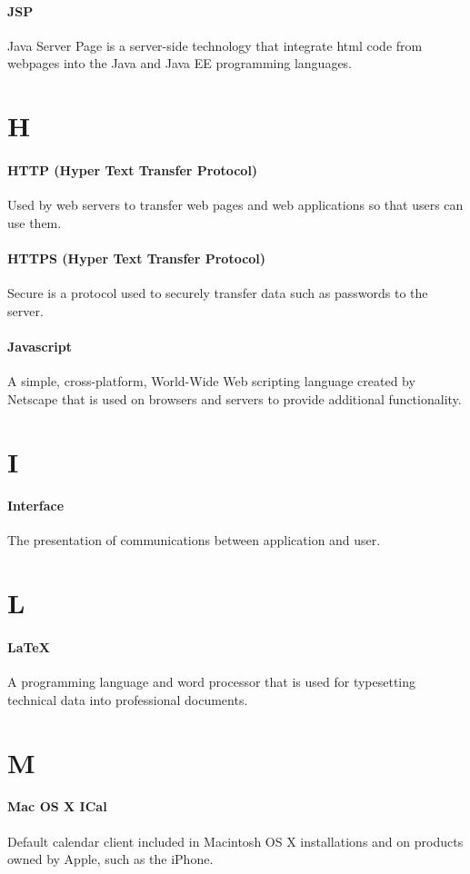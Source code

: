 \documentclass[letterpaper,12pt]{report}
\begin{document}
\paragraph{JSP} Java Server Page is a server-side technology that integrate html code from webpages into the Java and Java EE programming languages.
\section*{H}
\paragraph{HTTP (Hyper Text Transfer Protocol)} Used by web servers to transfer web pages and web applications so that users can use them.
\paragraph{HTTPS (Hyper Text Transfer Protocol)} Secure is a protocol used to securely transfer data such as passwords to the server. 
\paragraph{Javascript} A simple, cross-platform, World-Wide Web scripting language created by Netscape that is used on browsers and servers to provide additional functionality.
\section*{I}
\paragraph{Interface} The presentation of communications between application and user.
\section*{L}
\paragraph{LaTeX} A programming language and word processor that is used for typesetting technical data into professional documents.
\section*{M}
\paragraph{Mac OS X ICal} Default calendar client included in Macintosh OS X installations and on products owned by Apple, such as the iPhone.
\end{document}
